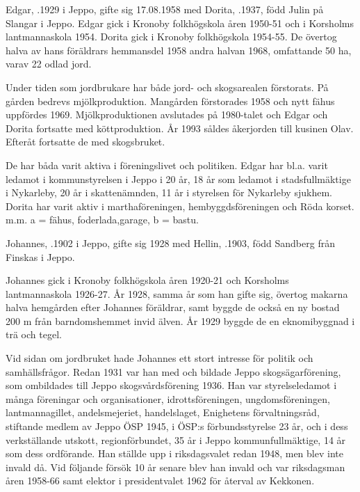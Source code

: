 Edgar, .1929 i Jeppo, gifte sig 17.08.1958 med Dorita, .1937, född Julin på Slangar i Jeppo.
Edgar gick i Kronoby folkhögskola åren 1950-51 och i Korsholms lantmannaskola 1954. Dorita gick i Kronoby folkhögskola 1954-55. De övertog halva av hans föräldrars hemmansdel 1958 andra halvan 1968, omfattande 50 ha, varav 22 odlad jord.

Under tiden som jordbrukare har både jord- och skogsarealen förstorats. På gården bedrevs mjölkproduktion. Mangården förstorades 1958 och nytt fähus uppfördes 1969. Mjölkproduktionen avslutades på 1980-talet och Edgar och Dorita fortsatte med köttproduktion. År 1993 såldes åkerjorden till kusinen Olav. Efteråt fortsatte de med skogsbruket.


De har båda varit aktiva i föreningslivet och politiken. Edgar har bl.a. varit ledamot i kommunstyrelsen i Jeppo i 20 år, 18 år som ledamot i stadsfullmäktige i Nykarleby, 20 år i skattenämnden, 11 år i styrelsen för Nykarleby sjukhem. Dorita har varit aktiv i marthaföreningen, hembyggdsföreningen och Röda korset. m.m. a = fähus, foderlada,garage, b = bastu.


Johannes, .1902 i Jeppo, gifte sig 1928 med Hellin, .1903, född Sandberg från Finskas i Jeppo.
\begin{jhchildren}
  \item {}
  \item {}
  \item {}
\end{jhchildren}
Johannes gick i Kronoby folkhögskola åren 1920-21 och Korsholms lantmannaskola 1926-27. År 1928, samma år som han gifte sig, övertog makarna halva hemgården efter Johannes föräldrar, samt byggde de också en ny bostad 200 m från barndomshemmet invid älven. År 1929 byggde de en eknomibyggnad i trä och tegel.

Vid sidan om jordbruket hade Johannes ett stort intresse för politik och samhällsfrågor. Redan 1931 var han med och bildade Jeppo skogsägarförening, som ombildades till Jeppo skogsvårdsförening 1936. Han var styrelseledamot i många föreningar och organisationer, idrottsföreningen, ungdomsföreningen, lantmannagillet, andelsmejeriet, handelslaget, Enighetens förvaltningsråd, stiftande medlem av Jeppo ÖSP 1945, i ÖSP:s förbundsstyrelse 23 år, och i dess verkställande utskott, regionförbundet, 35 år i Jeppo kommunfullmäktige, 14 år som dess ordförande. Han ställde upp i riksdagsvalet redan 1948, men blev inte invald då. Vid följande försök 10 år senare blev han invald och var riksdagsman åren 1958-66 samt elektor i presidentvalet 1962 för återval av Kekkonen.

